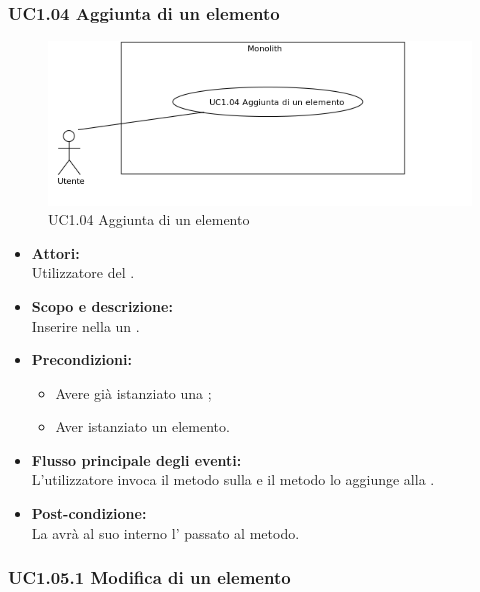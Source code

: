 \subsubsection{UC1.04 Aggiunta di un elemento} \label{UC1.04}

\begin{figure}[H]
	\centering
	\includegraphics[width=15cm]{../../documenti/AnalisiDeiRequisiti/Diagrammi_img/uc1_04.png}
	\caption{UC1.04 Aggiunta di un elemento}
\end{figure}

\begin{itemize}
	\item \textbf{Attori:}
	\\Utilizzatore del .
	\item \textbf{Scopo e descrizione:} 
	\\Inserire nella  un .
	\item \textbf{Precondizioni:}
	\begin{itemize}
		\item Avere già istanziato una ;
		\item Aver istanziato un elemento.
	\end{itemize}
	\item \textbf{Flusso principale degli eventi:}
	\\L'utilizzatore invoca il metodo sulla  e il metodo lo aggiunge alla .
	\item \textbf{Post-condizione:}
	\\La {} avrà al suo interno l' passato al metodo.
\end{itemize}

\subsubsection{UC1.05.1 Modifica di un elemento} \label{UC1.05.1}

